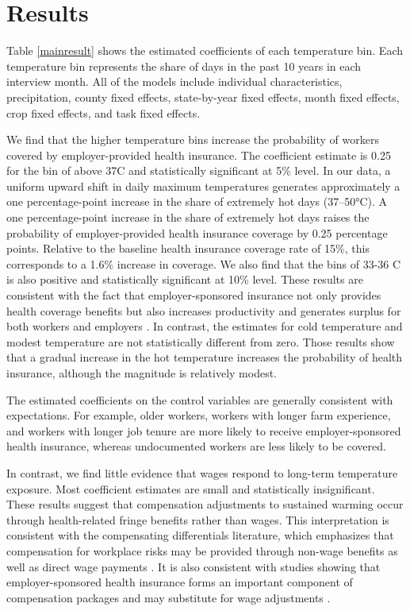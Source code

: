 \documentclass[12pt]{article}
\begin{document}
\clearpage
\section{Results}
Table \ref{mainresult} shows the estimated coefficients of each temperature bin. Each temperature bin represents the share of days in the past 10 years in each interview month. All of the models include individual characteristics, precipitation, county fixed effects, state-by-year fixed effects, month fixed effects, crop fixed effects, and task fixed effects. 

We find that the higher temperature bins increase the probability of workers covered by employer-provided health insurance. The coefficient estimate is 0.25 for the bin of above 37\degree C and statistically significant at 5\% level. In our data, a uniform upward shift in daily maximum temperatures generates approximately a one percentage-point increase in the share of extremely hot days (37–50°C). A one percentage-point increase in the share of extremely hot days raises the probability of employer-provided health insurance coverage by 0.25 percentage points. Relative to the baseline health insurance coverage rate of 15\%, this corresponds to a 1.6\% increase in coverage. We also find that the bins of 33-36 \degree C is also positive and statistically significant at 10\% level. These results are consistent with the fact that employer-sponsored insurance not only provides health coverage benefits but also increases productivity and generates surplus for both workers and employers \citep{rutledge_health_2026}.
In contrast, the estimates for cold temperature and modest temperature are not statistically different from zero. Those results show that a gradual increase in the hot temperature increases the probability of health insurance, although the magnitude is relatively modest. 

The estimated coefficients on the control variables are generally consistent with expectations. For example, older workers, workers with longer farm experience, and workers with longer job tenure are more likely to receive employer-sponsored health insurance, whereas undocumented workers are less likely to be covered.

In contrast, we find little evidence that wages respond to long-term temperature exposure. Most coefficient estimates are small and statistically insignificant. These results suggest that compensation adjustments to sustained warming occur through health-related fringe benefits rather than wages. This interpretation is consistent with the compensating differentials literature, which emphasizes that compensation for workplace risks may be provided through non-wage benefits as well as direct wage payments \citep{lavetti_compensating_2023}. It is also consistent with studies showing that employer-sponsored health insurance forms an important component of compensation packages and may substitute for wage adjustments \citep{dey_equilibrium_2005}.
\end{document}
